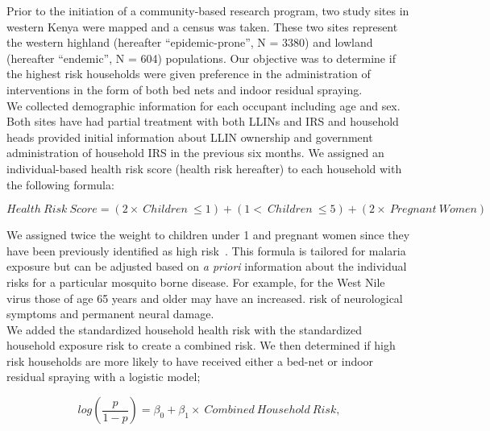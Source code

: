 \documentclass[10pt,letterpaper]{article}\usepackage[]{graphicx}\usepackage[]{color}
\begin{document}
Prior to the initiation of a community-based research program,  two study sites in western Kenya were mapped and a census was taken. These two sites represent the western highland (hereafter “epidemic-prone”,  N = 3380) and lowland (hereafter “endemic”,  N = 604) populations. Our objective was to determine if the highest risk households were given preference in the administration of interventions in the form of both bed nets and indoor residual spraying.\\

We collected demographic information for each occupant including age and sex. Both sites have had partial treatment with both LLINs and IRS and household heads provided initial information about LLIN ownership and government administration of household IRS in the previous six months.  We assigned an individual-based health risk score (health risk hereafter) to each household with the following formula:

$$Health\ Risk\ Score  =  (2 \times \ Children\ \leq 1) + (1 < \ Children\  \leq 5) + (2 \times \ Pregnant\ Women)$$

We assigned twice the weight to children under 1 and pregnant women since they have been previously identified as high risk~\cite{Gupta1999, Snow1999, Menendez2000}.  This formula is tailored for malaria exposure but can be adjusted based on \emph{a priori} information about the individual risks for a particular mosquito borne disease. For example, for the West Nile virus those of age 65 years and older may have an increased. risk of neurological symptoms and permanent neural damage.\\

We added the standardized household health risk with the standardized household exposure risk to create a combined risk.  We then determined if high risk households are more likely to have received either a bed-net or indoor residual spraying with a logistic model;

$$log(\frac{p}{1-p}) = \beta_0 + \beta_1 \times \ Combined\ Household\ Risk, $$
\end{document}
